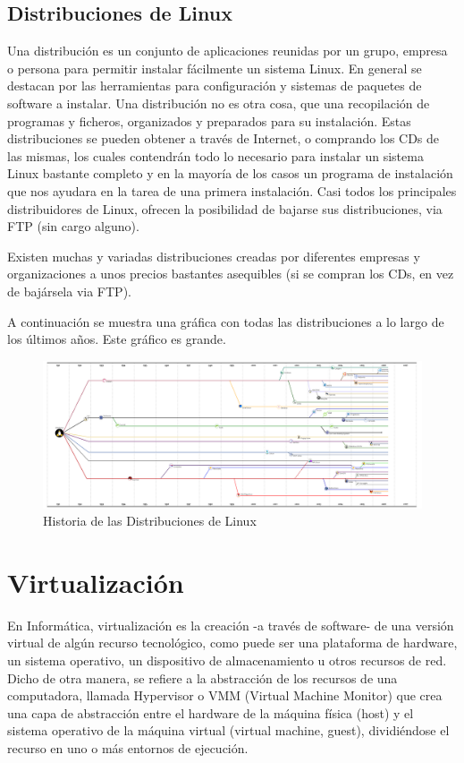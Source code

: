 \documentclass[12pt, twoside]{report}
\begin{document}
\subsection{Distribuciones de Linux}

Una distribución es un conjunto de aplicaciones reunidas por un grupo, empresa o persona para permitir instalar fácilmente un sistema Linux. En general se destacan por las herramientas para configuración y sistemas de paquetes de software a instalar.
Una distribución no es otra cosa, que una recopilación de programas y ficheros, organizados y preparados para su instalación. Estas distribuciones se pueden obtener a través de Internet, o comprando los CDs de las mismas, los cuales contendrán todo lo necesario para instalar un sistema Linux bastante completo y en la mayoría de los casos un programa de instalación que nos ayudara en la tarea de una primera instalación. Casi todos los principales distribuidores de Linux, ofrecen la posibilidad de bajarse sus distribuciones, via FTP (sin cargo alguno).

Existen muchas y variadas distribuciones creadas por diferentes empresas y organizaciones a unos precios bastantes asequibles (si se compran los CDs, en vez de bajársela via FTP).

A continuación se muestra una gráfica con todas las distribuciones a lo largo de los últimos años. Este gráfico es grande.

\begin{figure}
	\centering
	\includegraphics[width=1.0\linewidth]{linux_distros.png}
	\caption{Historia de las Distribuciones de Linux}
	\label{fig1003}
\end{figure}

\section{Virtualización}

En Informática, virtualización es la creación -a través de software- de una versión virtual de algún recurso tecnológico, como puede ser una plataforma de hardware, un sistema operativo, un dispositivo de almacenamiento u otros recursos de red. Dicho de otra manera, se refiere a la abstracción de los recursos de una computadora, llamada Hypervisor o VMM (Virtual Machine Monitor) que crea una capa de abstracción entre el hardware de la máquina física (host) y el sistema operativo de la máquina virtual (virtual machine, guest), dividiéndose el recurso en uno o más entornos de ejecución.
\end{document}
